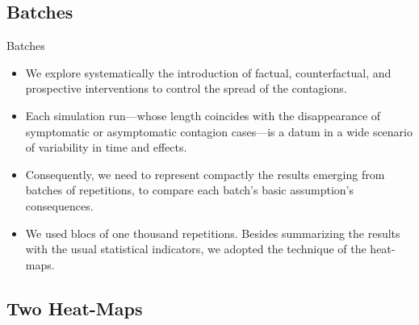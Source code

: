 \documentclass[8pt]{beamer}
\begin{document}
\subsection{Batches}

\begin{frame}{Batches}

  \begin{itemize}
  \item

We explore systematically the introduction of factual, counterfactual, and prospective interventions to control the spread of the contagions. 

  \item
Each simulation run---whose length coincides with the disappearance of symptomatic or asymptomatic contagion cases---is a datum in a wide scenario of variability in time and effects.   
  
  \item
  
Consequently, we need to represent compactly the results  emerging from batches of repetitions, to compare each batch's basic assumption's consequences.

 \item
We used blocs of one thousand repetitions. Besides summarizing the results with the usual statistical indicators, we adopted the technique of the heat-maps.

\end{itemize}
\end{frame}

\subsection{Two Heat-Maps}
\end{document}
